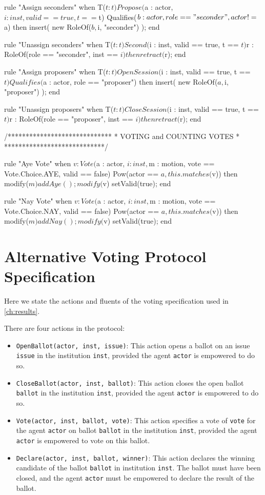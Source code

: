 \begin{droolsinline}
rule "Assign seconders"
	when
		T($t : t)
		Propose($a : actor, $i : inst, valid == true, t == $t)
		Qualifies($b : actor, role == "seconder", actor != $a)
	then
		insert( new RoleOf($b, $i, "seconder") );
end

rule "Unassign seconders"
	when
		T($t : t)
		Second($i : inst, valid == true, t == $t)
		$r : RoleOf(role == "seconder", inst == $i)
	then
		retract($r);
end

rule "Assign proposers"
	when
		T($t : t)
		OpenSession($i : inst, valid == true, t == $t)
		Qualifies($a : actor, role == "proposer")
	then
		insert( new RoleOf($a, $i, "proposer") );
end

rule "Unassign proposers"
	when
		T($t : t)
		CloseSession($i : inst, valid == true, t == $t)
		$r : RoleOf(role == "proposer", inst == $i)
	then
		retract($r);
end

/*****************************
 * VOTING and COUNTING VOTES *
 ****************************/

rule "Aye Vote"
	when
		$v : Vote($a : actor, $i : inst, $m : motion, vote == Vote.Choice.AYE, valid == false)
		Pow(actor == $a, this.matches($v))
	then
		modify($m) {
			addAye();	
		}
		modify($v) {
			setValid(true);
		}
end

rule "Nay Vote"
	when
		$v : Vote($a : actor, $i : inst, $m : motion, vote == Vote.Choice.NAY, valid == false)
		Pow(actor == $a, this.matches($v))
	then
		modify($m) {
			addNay();
		}
		modify($v) {
			setValid(true);
		}
end
\end{droolsinline}

\section{Alternative Voting Protocol Specification}

Here we state the actions and fluents of the voting specification used in \autoref{ch:results}.

There are four actions in the protocol:
\begin{itemize}
\item \texttt{OpenBallot(actor, inst, issue)}: This action opens a ballot on an issue \texttt{issue} in the institution \texttt{inst}, provided the agent \texttt{actor} is empowered to do so.
\item \texttt{CloseBallot(actor, inst, ballot)}: This action closes the open ballot \texttt{ballot} in the institution \texttt{inst}, provided the agent \texttt{actor} is empowered to do so.
\item \texttt{Vote(actor, inst, ballot, vote)}: This action specifies a vote of \texttt{vote} for the agent \texttt{actor} on ballot \texttt{ballot} in the institution \texttt{inst}, provided the agent \texttt{actor} is empowered to vote on this ballot.
\item \texttt{Declare(actor, inst, ballot, winner)}: This action declares the winning candidate of the ballot \texttt{ballot} in institution \texttt{inst}. The ballot must have been closed, and the agent \texttt{actor} must be empowered to declare the result of the ballot.
\end{itemize}

